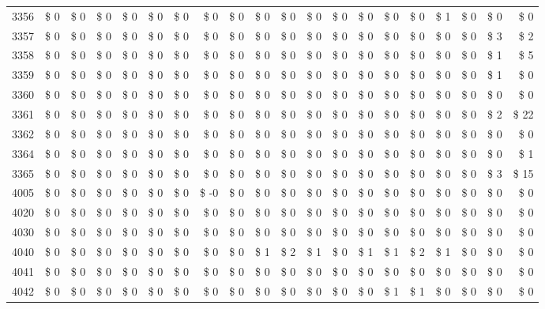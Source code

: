 \begin{longtable}{lrrrrrrrrrrrrrrrrrrr}
3356 & \$ 0 & \$ 0 & \$ 0 & \$ 0 & \$ 0 & \$ 0 & \$ 0 & \$ 0 & \$ 0 & \$ 0 & \$ 0 & \$ 0 & \$ 0 & \$ 0 & \$ 0 & \$ 1 & \$ 0 & \$ 0 & \$ 0 \\
3357 & \$ 0 & \$ 0 & \$ 0 & \$ 0 & \$ 0 & \$ 0 & \$ 0 & \$ 0 & \$ 0 & \$ 0 & \$ 0 & \$ 0 & \$ 0 & \$ 0 & \$ 0 & \$ 0 & \$ 0 & \$ 3 & \$ 2 \\
3358 & \$ 0 & \$ 0 & \$ 0 & \$ 0 & \$ 0 & \$ 0 & \$ 0 & \$ 0 & \$ 0 & \$ 0 & \$ 0 & \$ 0 & \$ 0 & \$ 0 & \$ 0 & \$ 0 & \$ 0 & \$ 1 & \$ 5 \\
3359 & \$ 0 & \$ 0 & \$ 0 & \$ 0 & \$ 0 & \$ 0 & \$ 0 & \$ 0 & \$ 0 & \$ 0 & \$ 0 & \$ 0 & \$ 0 & \$ 0 & \$ 0 & \$ 0 & \$ 0 & \$ 1 & \$ 0 \\
3360 & \$ 0 & \$ 0 & \$ 0 & \$ 0 & \$ 0 & \$ 0 & \$ 0 & \$ 0 & \$ 0 & \$ 0 & \$ 0 & \$ 0 & \$ 0 & \$ 0 & \$ 0 & \$ 0 & \$ 0 & \$ 0 & \$ 0 \\
3361 & \$ 0 & \$ 0 & \$ 0 & \$ 0 & \$ 0 & \$ 0 & \$ 0 & \$ 0 & \$ 0 & \$ 0 & \$ 0 & \$ 0 & \$ 0 & \$ 0 & \$ 0 & \$ 0 & \$ 0 & \$ 2 & \$ 22 \\
3362 & \$ 0 & \$ 0 & \$ 0 & \$ 0 & \$ 0 & \$ 0 & \$ 0 & \$ 0 & \$ 0 & \$ 0 & \$ 0 & \$ 0 & \$ 0 & \$ 0 & \$ 0 & \$ 0 & \$ 0 & \$ 0 & \$ 0 \\
3364 & \$ 0 & \$ 0 & \$ 0 & \$ 0 & \$ 0 & \$ 0 & \$ 0 & \$ 0 & \$ 0 & \$ 0 & \$ 0 & \$ 0 & \$ 0 & \$ 0 & \$ 0 & \$ 0 & \$ 0 & \$ 0 & \$ 1 \\
3365 & \$ 0 & \$ 0 & \$ 0 & \$ 0 & \$ 0 & \$ 0 & \$ 0 & \$ 0 & \$ 0 & \$ 0 & \$ 0 & \$ 0 & \$ 0 & \$ 0 & \$ 0 & \$ 0 & \$ 0 & \$ 3 & \$ 15 \\
4005 & \$ 0 & \$ 0 & \$ 0 & \$ 0 & \$ 0 & \$ 0 & \$ -0 & \$ 0 & \$ 0 & \$ 0 & \$ 0 & \$ 0 & \$ 0 & \$ 0 & \$ 0 & \$ 0 & \$ 0 & \$ 0 & \$ 0 \\
4020 & \$ 0 & \$ 0 & \$ 0 & \$ 0 & \$ 0 & \$ 0 & \$ 0 & \$ 0 & \$ 0 & \$ 0 & \$ 0 & \$ 0 & \$ 0 & \$ 0 & \$ 0 & \$ 0 & \$ 0 & \$ 0 & \$ 0 \\
4030 & \$ 0 & \$ 0 & \$ 0 & \$ 0 & \$ 0 & \$ 0 & \$ 0 & \$ 0 & \$ 0 & \$ 0 & \$ 0 & \$ 0 & \$ 0 & \$ 0 & \$ 0 & \$ 0 & \$ 0 & \$ 0 & \$ 0 \\
4040 & \$ 0 & \$ 0 & \$ 0 & \$ 0 & \$ 0 & \$ 0 & \$ 0 & \$ 0 & \$ 1 & \$ 2 & \$ 1 & \$ 0 & \$ 1 & \$ 1 & \$ 2 & \$ 1 & \$ 0 & \$ 0 & \$ 0 \\
4041 & \$ 0 & \$ 0 & \$ 0 & \$ 0 & \$ 0 & \$ 0 & \$ 0 & \$ 0 & \$ 0 & \$ 0 & \$ 0 & \$ 0 & \$ 0 & \$ 0 & \$ 0 & \$ 0 & \$ 0 & \$ 0 & \$ 0 \\
4042 & \$ 0 & \$ 0 & \$ 0 & \$ 0 & \$ 0 & \$ 0 & \$ 0 & \$ 0 & \$ 0 & \$ 0 & \$ 0 & \$ 0 & \$ 0 & \$ 1 & \$ 1 & \$ 0 & \$ 0 & \$ 0 & \$ 0 \\

\end{longtable}
